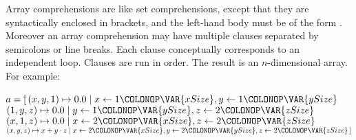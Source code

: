 Array comprehensions are like set comprehensions, except that they are
syntactically enclosed in brackets, and the left-hand body must be of
the form .  Moreover an array
comprehension may have multiple clauses separated by semicolons or
line breaks.  Each clause conceptually corresponds to an independent loop.
Clauses are run in order.  The result is an $n$-dimensional array.
For example:
\begin{Fortress}
\(a = [\null\)\pushtabs\=\+\((x,y,1) \mapsto 0.0   \mid x \gets 1\COLONOP\VAR{xSize}, y \gets 1\COLONOP\VAR{ySize}\)\\
\(      (1,y,z) \mapsto 0.0   \mid y \gets 1\COLONOP\VAR{ySize}, z \gets 2\COLONOP\VAR{zSize}\)\\
\(      (x,1,z) \mapsto 0.0   \mid x \gets 2\COLONOP\VAR{xSize}, z \gets 2\COLONOP\VAR{zSize}\)\\
\(      (x,y,z) \mapsto x+y\cdot z \mid x \gets 2\COLONOP\VAR{xSize}, y \gets 2\COLONOP\VAR{ySize}, z \gets 2\COLONOP\VAR{zSize}\,]\)\-\\\poptabs
\end{Fortress}
